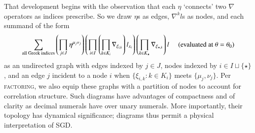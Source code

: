 \documentclass[anon,12pt]{colt2021} %
\newcommand{\squash}{\vspace{-0.15cm}}
\newcommand{\wrap}[1]{\left(#1\right)}
\begin{document}
            That development begins with the observation that each $\eta$
            `connects' two $\nabla$ operators as indices prescribe.  So we
            draw
            $\eta$s as edges, $\nabla^k l$s as nodes, and each
            summand of the form
            \squash
            $$
                \sum_{\text{all Greek indices}} \wrap{\prod_{j\in J} \eta^{\mu_j\nu_j}}
                \wrap{\prod_{i\in I} \wrap{\prod_{k\in K_i} \nabla_{\xi_{i,k}}}
                l_{x_i}} \wrap{\prod_{k\in K_\star} \nabla_{\xi_{\star,k}}}
                l\,\,\,\,\,\,\,\,\text{(evaluated at $\theta=\theta_0$)}
            \squash
            $$
            as an undirected graph with edges indexed by $j\in J$, nodes
            indexed by $i\in I\sqcup \{\star\}$, and an edge $j$ incident
            to a node $i$ when $\{\xi_{i,k}:k\in K_i\}$ meets
            $\{\mu_j,\nu_j\}$.  Per \textsc{factoring}, we also equip these
            graphs with a partition of nodes to account for correlation
            structure.
            Such diagrams have advantages of compactness and of clarity as
            decimal numerals have over unary numerals.  More importantly,
            their topology has dynamical significance; diagrams thus permit a
            physical interpretation of SGD.
\end{document}
